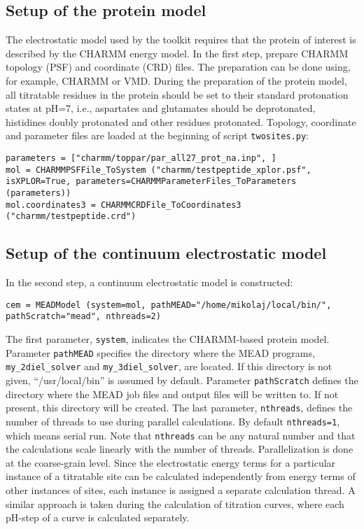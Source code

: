 \documentclass[12pt]{article}
\begin{document}
{\subsection{Setup of the protein model}
The electrostatic model used by the toolkit requires that the protein
of interest is described by the CHARMM energy model\cite{MacKerell1998}.
%
In the first step,
prepare CHARMM topology (PSF) and coordinate (CRD) files.
%
The preparation can be done using,
for example,
CHARMM\cite{CHARMM_Brooks1983} or VMD\cite{VMD1996}.
%
During the preparation of the protein model,
all titratable residues in the protein
should be set to their standard protonation states at pH=7,
i.e.,
aspartates and glutamates should be deprotonated, histidines doubly protonated
and other residues protonated.
%
Topology, coordinate and parameter files are loaded at the
beginning of script \texttt{twosites.py}:

{\footnotesize \singlespacing \begin{lstlisting}
parameters = ["charmm/toppar/par_all27_prot_na.inp", ]
mol = CHARMMPSFFile_ToSystem ("charmm/testpeptide_xplor.psf", isXPLOR=True, parameters=CHARMMParameterFiles_ToParameters (parameters))
mol.coordinates3 = CHARMMCRDFile_ToCoordinates3 ("charmm/testpeptide.crd")
\end{lstlisting} }


\subsection{Setup of the continuum electrostatic model}
%
In the second step, a continuum electrostatic model is constructed:

{\footnotesize \singlespacing \begin{lstlisting}
cem = MEADModel (system=mol, pathMEAD="/home/mikolaj/local/bin/", pathScratch="mead", nthreads=2)
\end{lstlisting} }

\bigskip
%
The first parameter, {\tt system},
indicates the CHARMM-based protein model.
%
Parameter {\tt pathMEAD} specifies the directory where the MEAD programs,
{\tt my\_2diel\_solver} and {\tt my\_3diel\_solver}, are located.
%
If this directory is not given,
``/usr/local/bin'' is assumed
by default.
%
Parameter {\tt pathScratch} defines the directory where the MEAD job files
and output files will be written to.
%
If not present,
this directory will be created.
%
The last parameter,
{\tt nthreads},
defines the number of threads to use during parallel calculations.
%
By default {\tt nthreads=1}, which means serial run.
%
Note that {\tt nthreads} can be any natural number and that the calculations
scale linearly with the number of threads.
%
Parallelization is done at the coarse-grain level.
%
Since the electrostatic energy terms for a particular instance of a titratable
site can be calculated independently from energy terms of other instances of
sites, each instance is assigned a separate calculation thread.
%
A similar approach is taken during the calculation of titration curves,
where each pH-step of a curve is calculated separately.


}
\end{document}
